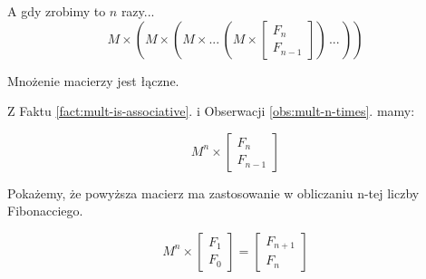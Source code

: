 \begin{observation}{A gdy zrobimy to $n$ razy...}
\label{obs:mult-n-times}
\begin{equation}
	M \times (M \times (M \times ...\, (M \times \begin{bmatrix}F_n \\ F_{n - 1}\end{bmatrix})\,...\,))
\end{equation}
\end{observation}

\begin{fact}{Mnożenie macierzy jest łączne.}
\label{fact:mult-is-associative}
\end{fact}

Z Faktu \ref{fact:mult-is-associative}. i Obserwacji \ref{obs:mult-n-times}. mamy:

\begin{equation}
	M^n \times \begin{bmatrix}F_n \\ F_{n - 1}\end{bmatrix}
\end{equation}

Pokażemy, że powyższa macierz ma zastosowanie w obliczaniu n-tej liczby Fibonacciego.

\begin{lemma}
\begin{equation}
	M^{n} \times \begin{bmatrix}F_1 \\ F_0\end{bmatrix} = \begin{bmatrix}F_{n + 1} \\ F_{n}\end{bmatrix}
\end{equation}
\end{lemma}

